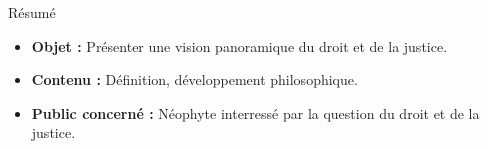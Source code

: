 \begin{center}
\Large
Résumé
\normalsize
\end{center}
\vspace{3cm}
\begin{itemize}[leftmargin=1cm, label=, itemsep=21pt]
\item {\bf Objet : } Présenter une vision panoramique du droit et de la justice.
\item {\bf Contenu : } Définition, développement philosophique.
\item {\bf Public concerné : } Néophyte interressé par la question du droit et de la justice.
\end{itemize}

\vspace{3cm}



\vspace{3cm}

